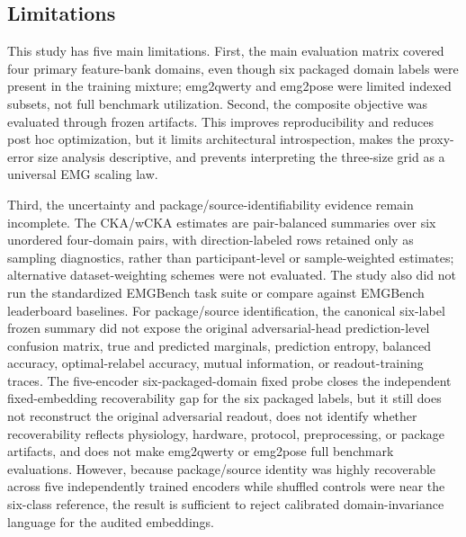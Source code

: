 \documentclass[journal]{IEEEtran}
\begin{document}
\subsection{Limitations}
This study has five main limitations. First, the main evaluation matrix covered four primary feature-bank domains, even though six packaged domain labels were present in the training mixture; emg2qwerty and emg2pose were limited indexed subsets, not full benchmark utilization. Second, the composite objective was evaluated through frozen artifacts. This improves reproducibility and reduces post hoc optimization, but it limits architectural introspection, makes the proxy-error size analysis descriptive, and prevents interpreting the three-size grid as a universal EMG scaling law.

Third, the uncertainty and package/source-identifiability evidence remain incomplete. The CKA/wCKA estimates are pair-balanced summaries over six unordered four-domain pairs, with direction-labeled rows retained only as sampling diagnostics, rather than participant-level or sample-weighted estimates; alternative dataset-weighting schemes were not evaluated. The study also did not run the standardized EMGBench task suite or compare against EMGBench leaderboard baselines. For package/source identification, the canonical six-label frozen summary did not expose the original adversarial-head prediction-level confusion matrix, true and predicted marginals, prediction entropy, balanced accuracy, optimal-relabel accuracy, mutual information, or readout-training traces. The five-encoder six-packaged-domain fixed probe closes the independent fixed-embedding recoverability gap for the six packaged labels, but it still does not reconstruct the original adversarial readout, does not identify whether recoverability reflects physiology, hardware, protocol, preprocessing, or package artifacts, and does not make emg2qwerty or emg2pose full benchmark evaluations. However, because package/source identity was highly recoverable across five independently trained encoders while shuffled controls were near the six-class reference, the result is sufficient to reject calibrated domain-invariance language for the audited embeddings.
\end{document}
